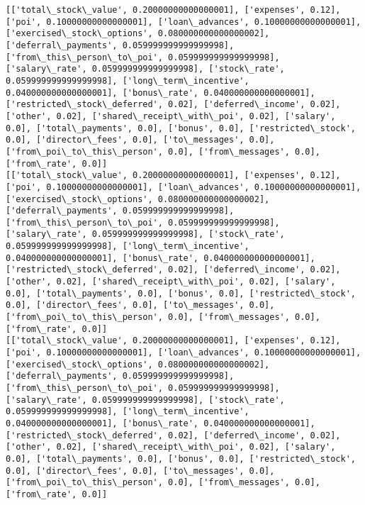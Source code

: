 \documentclass[11pt]{article}
\begin{document}
    \begin{Verbatim}[commandchars=\\\{\}]
[['total\_stock\_value', 0.20000000000000001], ['expenses', 0.12], ['poi', 0.10000000000000001], ['loan\_advances', 0.10000000000000001], ['exercised\_stock\_options', 0.080000000000000002], ['deferral\_payments', 0.059999999999999998], ['from\_this\_person\_to\_poi', 0.059999999999999998], ['salary\_rate', 0.059999999999999998], ['stock\_rate', 0.059999999999999998], ['long\_term\_incentive', 0.040000000000000001], ['bonus\_rate', 0.040000000000000001], ['restricted\_stock\_deferred', 0.02], ['deferred\_income', 0.02], ['other', 0.02], ['shared\_receipt\_with\_poi', 0.02], ['salary', 0.0], ['total\_payments', 0.0], ['bonus', 0.0], ['restricted\_stock', 0.0], ['director\_fees', 0.0], ['to\_messages', 0.0], ['from\_poi\_to\_this\_person', 0.0], ['from\_messages', 0.0], ['from\_rate', 0.0]]
[['total\_stock\_value', 0.20000000000000001], ['expenses', 0.12], ['poi', 0.10000000000000001], ['loan\_advances', 0.10000000000000001], ['exercised\_stock\_options', 0.080000000000000002], ['deferral\_payments', 0.059999999999999998], ['from\_this\_person\_to\_poi', 0.059999999999999998], ['salary\_rate', 0.059999999999999998], ['stock\_rate', 0.059999999999999998], ['long\_term\_incentive', 0.040000000000000001], ['bonus\_rate', 0.040000000000000001], ['restricted\_stock\_deferred', 0.02], ['deferred\_income', 0.02], ['other', 0.02], ['shared\_receipt\_with\_poi', 0.02], ['salary', 0.0], ['total\_payments', 0.0], ['bonus', 0.0], ['restricted\_stock', 0.0], ['director\_fees', 0.0], ['to\_messages', 0.0], ['from\_poi\_to\_this\_person', 0.0], ['from\_messages', 0.0], ['from\_rate', 0.0]]
[['total\_stock\_value', 0.20000000000000001], ['expenses', 0.12], ['poi', 0.10000000000000001], ['loan\_advances', 0.10000000000000001], ['exercised\_stock\_options', 0.080000000000000002], ['deferral\_payments', 0.059999999999999998], ['from\_this\_person\_to\_poi', 0.059999999999999998], ['salary\_rate', 0.059999999999999998], ['stock\_rate', 0.059999999999999998], ['long\_term\_incentive', 0.040000000000000001], ['bonus\_rate', 0.040000000000000001], ['restricted\_stock\_deferred', 0.02], ['deferred\_income', 0.02], ['other', 0.02], ['shared\_receipt\_with\_poi', 0.02], ['salary', 0.0], ['total\_payments', 0.0], ['bonus', 0.0], ['restricted\_stock', 0.0], ['director\_fees', 0.0], ['to\_messages', 0.0], ['from\_poi\_to\_this\_person', 0.0], ['from\_messages', 0.0], ['from\_rate', 0.0]]

    \end{Verbatim}
\end{document}
